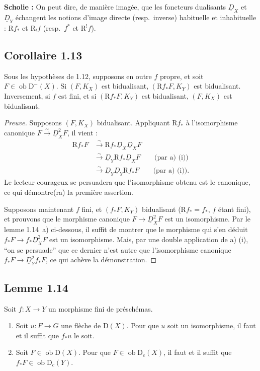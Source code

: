 \documentclass[11pt]{article}
\newcommand{\R}{\mathrm{R}}\newcommand{\RHomCore}{\mathrm{RHom}}
\newcommand{\D}{\mathrm{D}}
\newcommand{\ob}{\operatorname{ob}}
\providecommand{\ob}{\operatorname{ob}}
\providecommand{\R}{\mathrm R}
\begin{document}
\textbf{Scholie :} On peut dire, de manière imagée, que les foncteurs dualisants $\underline{D}_X$ et $\underline{D}_Y$ échangent les notions d'image directe (resp.~inverse) habituelle et inhabituelle : $\R f_{*}$ et $\R_{!}f$ (resp.~$f^{*}$ et $\R^{!}f$).

\subsection*{Corollaire 1.13}
Sous les hypothèses de 1.12, supposons en outre $f$ propre, et soit $F \in \ob \D^{-}(X)$. Si $(F, K_X)$ est bidualisant, $(\R f_{*}F, K_Y)$ est bidualisant. Inversement, si $f$ est fini, et si $(\R f_{*}F, K_Y)$ est bidualisant, $(F, K_X)$ est bidualisant.

\begin{proof}[Preuve]
Supposons $(F, K_X)$ bidualisant. Appliquant $\R f_{*}$ à l'isomorphisme canonique $F \xrightarrow{\sim} \underline{D}_X^{2} F$, il vient :
\begin{align*}
\R f_{*} F &\xrightarrow{\sim} \R f_{*} \underline{D}_X \underline{D}_X F \\
&\xrightarrow{\sim} \underline{D}_Y \R f_{*} \underline{D}_X F \qquad \text{(par a) (i))} \\
&\xrightarrow{\sim} \underline{D}_Y \underline{D}_Y \R f_{*} F \qquad \text{(par a) (i)).}
\end{align*}
Le lecteur courageux se persuadera que l'isomorphisme obtenu est le canonique, ce qui démontre(ra) la première assertion.

Supposons maintenant $f$ fini, et $(f_{*}F, K_Y)$ bidualisant ($\R f_{*} = f_{*}$, $f$ étant fini), et prouvons que le morphisme canonique $F \to \underline{D}_X^{2} F$ est un isomorphisme. Par le lemme 1.14~a) ci-dessous, il suffit de montrer que le morphisme qui s'en déduit $f_{*}F \to f_{*}\underline{D}_X^{2} F$ est un isomorphisme. Mais, par une double application de a) (i), ``on se persuade'' que ce dernier n'est autre que l'isomorphisme canonique $f_{*}F \to \underline{D}_Y^{2} f_{*}F$, ce qui achève la démonstration.
\end{proof}

\subsection*{Lemme 1.14}
Soit $f : X \to Y$ un morphisme fini de préschémas.
\begin{enumerate}
\item[a)] Soit $u : F \to G$ une flèche de $\D(X)$. Pour que $u$ soit un isomorphisme, il faut et il suffit que $f_{*}u$ le soit.
\item[b)] Soit $F \in \ob \D(X)$. Pour que $F \in \ob \D_c(X)$, il faut et il suffit que $f_{*}F \in \ob \D_c(Y)$.
\end{enumerate}
\end{document}
